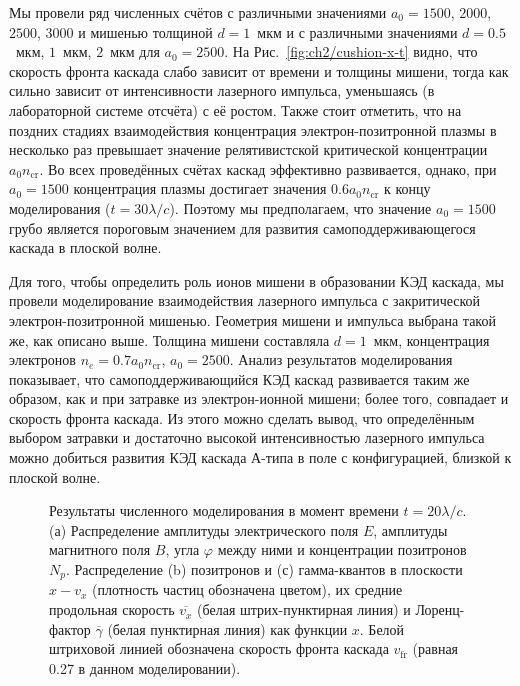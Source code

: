 Мы провели ряд численных счётов с различными значениями $a_{0}=1500$, $2000$, $2500$, $3000$ и мишенью толщиной $d=1$~мкм и с различными значениями $d=0.5$~мкм, $1$~мкм, $2$~мкм для $a_{0}=2500$. 
На Рис.~\ref{fig:ch2/cushion-x-t} видно, что скорость фронта каскада слабо зависит от времени и толщины мишени, тогда как сильно зависит от интенсивности лазерного импульса, уменьшаясь (в лабораторной системе отсчёта) с её ростом. 
Также стоит отметить, что на поздних стадиях взаимодействия концентрация электрон-позитронной плазмы в несколько раз превышает значение релятивистской критической концентрации~$a_0 n_\mathrm{cr}$. 
Во всех проведённых счётах каскад эффективно развивается, однако, при $a_0=1500$ концентрация плазмы достигает значения $0.6 a_0 n_\mathrm{cr}$ к концу моделирования ($t = 30 \lambda/c$).
Поэтому мы предполагаем, что значение $a_0=1500$ грубо является пороговым значением для развития самоподдерживающегося каскада в плоской волне.

Для того, чтобы определить роль ионов мишени в образовании КЭД каскада, мы провели моделирование взаимодействия лазерного импульса с закритической электрон-позитронной мишенью. 
Геометрия мишени и импульса выбрана такой же, как описано выше. 
Толщина мишени составляла $d=1$~мкм, концентрация электронов $n_e = 0.7 a_0 n_\mathrm{cr}$, $a_0=2500$. 
Анализ результатов моделирования показывает, что самоподдерживающийся КЭД каскад развивается таким же образом, как и при затравке из электрон-ионной мишени; более того, совпадает и скорость фронта каскада. 
Из этого можно сделать вывод, что определённым выбором затравки и достаточно высокой интенсивностью лазерного импульса можно добиться развития КЭД каскада А-типа в поле с конфигурацией, близкой к плоской волне.

\begin{figure}[h!]
    \caption[Результаты численного моделирования развития КЭД каскада в плоской волн]{\label{fig:ch2/field-structure} Результаты численного моделирования в момент времени ${t = 20 \lambda / c}$. (а) Распределение амплитуды электрического поля $E$, амплитуды магнитного поля $B$, угла $\varphi$ между ними и концентрации позитронов $N_p$. Распределение (b) позитронов и (с) гамма-квантов в плоскости $x - v_{x}$ (плотность частиц обозначена цветом), их средние продольная скорость $\overline{v_x}$ (белая штрих-пунктирная линия) и Лоренц-фактор $\overline{\gamma}$ (белая пунктирная линия) как функции $x$. Белой штриховой линией обозначена скорость фронта каскада $v_\mathrm{fr}$ (равная 0.27 в данном моделировании).}
\end{figure}


